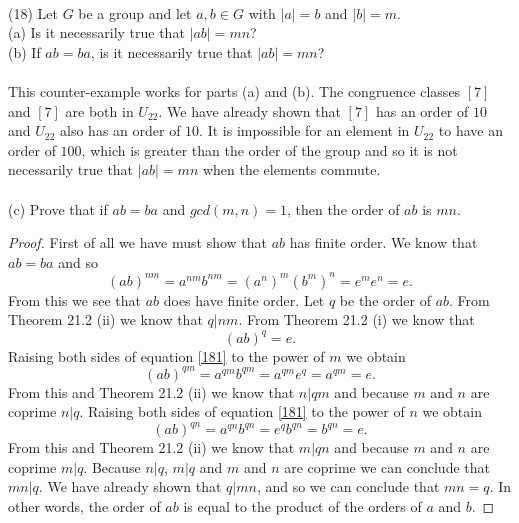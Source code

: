 \documentclass[11pt,a4paper]{article}
\begin{document}
~\\
(18) Let $G$ be a group and let $a,b\in G$ with $|a| = b$ and $|b| = m$.\\
(a) Is it necessarily true that $|ab| = mn$?\\
(b) If $ab = ba$, is it necessarily true that $|ab| = mn$?\\
~\\
This counter-example works for parts (a) and (b). The congruence classes $[7]$ and $[7]$ are both in $U_{22}$. We have already shown that $[7]$ has an order of $10$ and $U_{22}$ also has an order of $10$. It is impossible for an element in $U_{22}$ to have an order of $100$, which is greater than the order of the group and so it is not necessarily true that $|ab| = mn$ when the elements commute.\\
~\\
(c) Prove that if $ab = ba$ and $gcd(m,n) = 1$, then the order of $ab$ is $mn$.

\begin{proof}
First of all we have must show that $ab$ has finite order. We know that $ab = ba$ and so
\[(ab)^{nm} = a^{nm}b^{nm} = (a^n)^m (b^m)^n = e^m e^n = e.\]
From this we see that $ab$ does have finite order. Let $q$ be the order of $ab$. From Theorem 21.2 (ii) we know that $q | nm$. From Theorem 21.2 (i) we know that
\begin{equation}\label{181}
(ab)^q = e.
\end{equation}
Raising both sides of equation \eqref{181} to the power of $m$ we obtain
\[(ab)^{qm} = a^{qm} b^{qm} = a^{qm} e^q = a^{qm} = e.\]
From this and Theorem 21.2 (ii) we know that $n | qm$ and because $m$ and $n$ are coprime $n | q$.
Raising both sides of equation \eqref{181} to the power of $n$ we obtain
\[(ab)^{qn} = a^{qn} b^{qn} = e^q b^{qn} = b^{qn} = e.\]
From this and Theorem 21.2 (ii) we know that $m | qn$ and because $m$ and $n$ are coprime $m | q$.
Because $n | q$, $m | q$ and $m$ and $n$ are coprime we can conclude that $mn | q$. We have already shown that $q | mn$, and so we can conclude that $mn = q$. In other words, the order of $ab$ is equal to the product of the orders of $a$ and $b$.
\end{proof}
\end{document}
